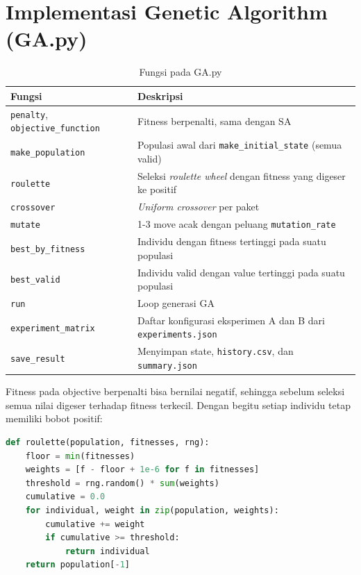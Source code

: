 \documentclass[12pt,a4paper]{report}
\newcommand{\hd}[1]{\cellcolor{hdr}\textbf{#1}}
\newcommand{\code}[1]{\texttt{\small #1}}
\begin{document}
\section{Implementasi Genetic Algorithm (GA.py)}
\begin{table}[H]
\centering
\caption{Fungsi pada GA.py}
\small
\begin{tabular}{|L{4.6cm}|L{8.6cm}|}
\hline
\hd{Fungsi} & \hd{Deskripsi} \\ \hline
\code{penalty}, \code{objective\_function} & Fitness berpenalti, sama dengan SA \\ \hline
\code{make\_population} & Populasi awal dari \code{make\_initial\_state} (semua valid) \\ \hline
\code{roulette} & Seleksi \textit{roulette wheel} dengan fitness yang digeser ke positif \\ \hline
\code{crossover} & \textit{Uniform crossover} per paket \\ \hline
\code{mutate} & 1-3 move acak dengan peluang \code{mutation\_rate} \\ \hline
\code{best\_by\_fitness} & Individu dengan fitness tertinggi pada suatu populasi \\ \hline
\code{best\_valid} & Individu valid dengan value tertinggi pada suatu populasi \\ \hline
\code{run} & Loop generasi GA \\ \hline
\code{experiment\_matrix} & Daftar konfigurasi eksperimen A dan B dari \code{experiments.json} \\ \hline
\code{save\_result} & Menyimpan state, \code{history.csv}, dan \code{summary.json} \\ \hline
\end{tabular}
\end{table}

Fitness pada objective berpenalti bisa bernilai negatif, sehingga sebelum seleksi semua nilai
digeser terhadap fitness terkecil. Dengan begitu setiap individu tetap memiliki bobot positif:
\begin{lstlisting}[language=Python]
def roulette(population, fitnesses, rng):
    floor = min(fitnesses)
    weights = [f - floor + 1e-6 for f in fitnesses]
    threshold = rng.random() * sum(weights)
    cumulative = 0.0
    for individual, weight in zip(population, weights):
        cumulative += weight
        if cumulative >= threshold:
            return individual
    return population[-1]
\end{lstlisting}
\end{document}
